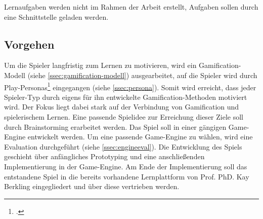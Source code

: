 	Lernaufgaben werden nicht im Rahmen der Arbeit erstellt, Aufgaben sollen durch eine Schnittstelle geladen werden.

\subsection{Vorgehen}
	Um die Spieler langfristig zum Lernen zu motivieren, wird ein Gamification-Modell (siehe \ref{ssec:gamification-modell}) ausgearbeitet, auf die Spieler wird durch Play-Personas\footcite{persona} eingegangen (siehe \ref{ssec:persona}). Somit wird erreicht, dass jeder Spieler-Typ durch eigens für ihn entwickelte Gamification-Methoden motiviert wird. Der Fokus liegt dabei stark auf der Verbindung von Gamification und spielerischem Lernen.
	Eine passende Spielidee zur Erreichung dieser Ziele soll durch Brainstorming erarbeitet werden.
	Das Spiel soll in einer gängigen Game-Engine entwickelt werden. Um eine passende Game-Engine zu wählen, wird eine Evaluation durchgeführt (siehe \ref{ssec:engineeval}).
	Die Entwicklung des Spiels geschieht über anfängliches Prototyping und eine anschließenden Implementierung in der Game-Engine. Am Ende der Implementierung soll das entstandene Spiel in die bereits vorhandene Lernplattform von Prof. PhD. Kay Berkling eingegliedert und über diese vertrieben werden.
